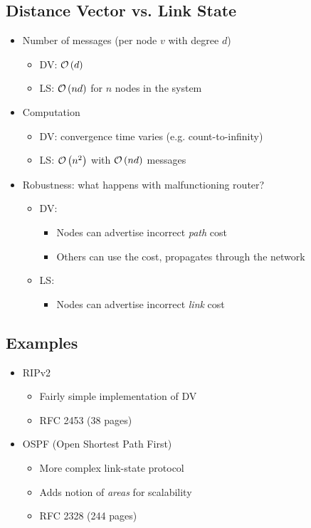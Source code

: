 \subsection{Distance Vector vs. Link State}
\begin{itemize}[nosep]
    \item Number of messages (per node $v$ with degree $d$)
          \begin{itemize}[nosep]
              \item DV: $\mathcal{O}\left(d\right)$
              \item LS: $\mathcal{O}\left(nd\right)$ for $n$ nodes in the system
          \end{itemize}
    \item Computation
          \begin{itemize}[nosep]
              \item DV: convergence time varies (e.g. count-to-infinity)
              \item LS: $\mathcal{O}\left(n^2\right)$ with $\mathcal{O}\left(nd\right)$ messages
          \end{itemize}
    \item Robustness: what happens with malfunctioning router?
          \begin{itemize}[nosep]
              \item DV:
                    \begin{itemize}[nosep]
                        \item Nodes can advertise incorrect \emph{path} cost
                        \item Others can use the cost, propagates through the network
                    \end{itemize}
              \item LS:
                    \begin{itemize}[nosep]
                        \item Nodes can advertise incorrect \emph{link} cost
                    \end{itemize}
          \end{itemize}
\end{itemize}
\subsection{Examples}
\begin{itemize}[nosep]
    \item RIPv2
          \begin{itemize}[nosep]
              \item Fairly simple implementation of DV
              \item RFC 2453 (38 pages)
          \end{itemize}
    \item OSPF (Open Shortest Path First)
          \begin{itemize}[nosep]
              \item More complex link-state protocol
              \item Adds notion of \emph{areas} for scalability
              \item RFC 2328 (244 pages)
          \end{itemize}
\end{itemize}
